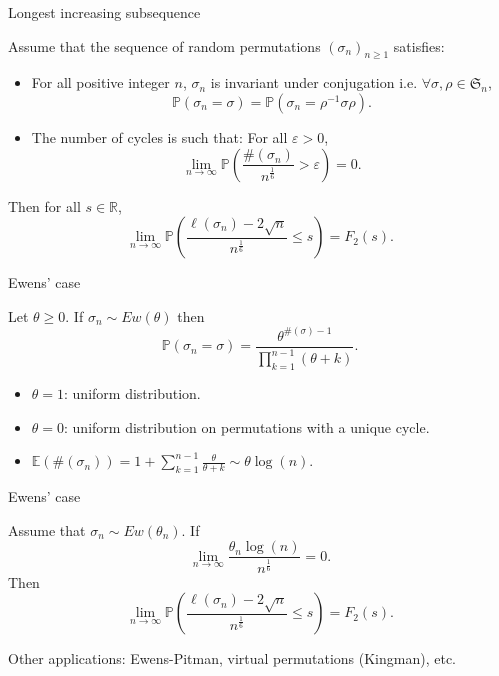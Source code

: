 \documentclass[english,xcolor=table]{beamer}
\begin{document}
\begin{frame}{Longest increasing subsequence}
    \begin{theorem}[\cite{sk}]
Assume that the sequence of random permutations  $(\sigma_n)_{n\geq 1}$ satisfies:
\begin{itemize}
\item  For all positive integer $n$, $\sigma_n$ is invariant under conjugation i.e.  $\forall \sigma , \rho \in \mathfrak{S}_n$,
\begin{equation}\tag{H1}\label{h1}
\mathbb{P}(\sigma_n=\sigma)=\mathbb{P}(\sigma_n=\rho^{-1}\sigma\rho).
\end{equation}
\item The number of cycles is such that: For all $\varepsilon>0$,
\begin{equation}\tag{H2}\label{h2}
\lim_{n\to \infty}\mathbb{P}\left(\frac{\#(\sigma_n)}{n^\frac 16 }>\varepsilon\right) =0.
\end{equation}
\end{itemize}
Then  for all  $s \in \mathbb{R}$,
\begin{equation}\tag{TW}\label{TW} 
\lim_{n\to \infty} \mathbb{P}\left(\frac{\ell(\sigma_n)-2\sqrt{n}}{n^\frac 16}\leq s\right)=F_2(s).
\end{equation}
\end{theorem}
\end{frame}

\begin{frame}{Ewens' case}
\begin{definition}
Let $\theta\geq 0$. If $\sigma_n\sim Ew(\theta)$ then
\begin{equation*}
\mathbb{P}(\sigma_n=\sigma)=\frac{\theta^{\#(\sigma)-1}}{\prod_{k=1}^{n-1}(\theta+k)}.\end{equation*}
\end{definition}
\vspace{5 mm}

\begin{itemize}
\item $\theta=1$:  uniform distribution.
\item $\theta=0$: uniform distribution on permutations with a unique cycle. 
\item $\mathbb{E}(\#(\sigma_n))= 1+\sum_{k=1}^{n-1} \frac{\theta}{\theta+k}\sim \theta \log(n).$
\end{itemize}
\end{frame}
\begin{frame}{Ewens' case}
\begin{corollary} \label{2.1}
Assume that $\sigma_n\sim Ew(\theta_n)$. If
\begin{equation}\tag{H'2}\label{ewcond}
\lim_{n\to \infty} \frac{\theta_n \log(n)  }{n^\frac 1 6}=0.
\end{equation}
Then 
\begin{equation}  \tag{TW}
\lim_{n\to \infty} \mathbb{P}\left(\frac{\ell(\sigma_n)-2\sqrt{n}}{n^\frac 16}\leq s\right)=F_2(s).
\end{equation}
\end{corollary}
\vspace{10 mm }
Other applications: Ewens-Pitman, virtual permutations (Kingman), etc.
\end{frame}
\end{document}
